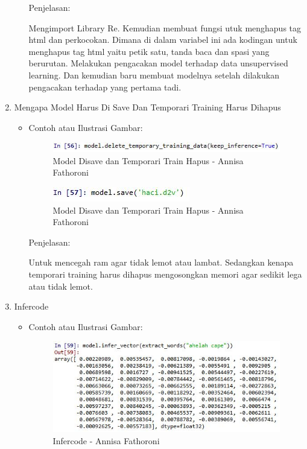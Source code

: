 \begin{enumerate}
\begin{itemize}
Penjelasan:

Mengimport Library Re. Kemudian membuat fungsi utuk menghapus tag html dan perkocokan. Dimana di dalam variabel ini ada kodingan untuk menghapus tag html yaitu petik satu, tanda baca dan spasi yang berurutan. Melakukan pengacakan model terhadap data unsupervised learning. Dan kemudian baru membuat modelnya setelah dilakukan pengacakan terhadap yang pertama tadi.

\end{itemize}

\item Mengapa Model Harus Di Save Dan Temporari Training Harus Dihapus
\begin{itemize}
\item Contoh atau Ilustrasi Gambar:

\begin{figure}[!hbtp]
\centering
\includegraphics[scale=0.7]{figures/Chapter5AnnisaFathoroni49.jpg}
\caption{Model Disave dan Temporari Train Hapus - Annisa Fathoroni}
\label{Model Disave dan Temporari Train Hapus - Annisa Fathoroni}
\end{figure}

\begin{figure}[!hbtp]
\centering
\includegraphics[scale=0.7]{figures/Chapter5AnnisaFathoroni50.jpg}
\caption{Model Disave dan Temporari Train Hapus - Annisa Fathoroni}
\label{Model Disave dan Temporari Train Hapus - Annisa Fathoroni}
\end{figure}

Penjelasan:

Untuk mencegah ram agar tidak lemot atau lambat. Sedangkan kenapa temporari training harus dihapus mengosongkan memori agar sedikit lega atau tidak lemot.

\end{itemize}

\item Infercode
\begin{itemize}
\item Contoh atau Ilustrasi Gambar:

\begin{figure}[!hbtp]
\centering
\includegraphics[scale=0.7]{figures/Chapter5AnnisaFathoroni51.jpg}
\caption{Infercode - Annisa Fathoroni}
\label{Infercode - Annisa Fathoroni}
\end{figure}


\end{itemize}
\end{enumerate}

